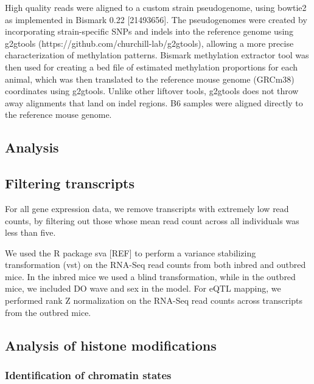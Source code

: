 \documentclass[10pt,letterpaper]{article}
\begin{document}
High quality reads were aligned to a custom strain pseudogenome, using
bowtie2 as implemented in Bismark 0.22 {[}21493656{]}. The pseudogenomes
were created by incorporating strain-specific SNPs and indels into the
reference genome using g2gtools
(https://github.com/churchill-lab/g2gtools), allowing a more precise
characterization of methylation patterns. Bismark methylation extractor
tool was then used for creating a bed file of estimated methylation
proportions for each animal, which was then translated to the reference
mouse genome (GRCm38) coordinates using g2gtools. Unlike other liftover
tools, g2gtools does not throw away alignments that land on indel
regions. B6 samples were aligned directly to the reference mouse genome.

\hypertarget{analysis}{%
\subsection{Analysis}\label{analysis}}

\hypertarget{filtering-transcripts}{%
\subsection{Filtering transcripts}\label{filtering-transcripts}}

For all gene expression data, we remove transcripts with extremely low
read counts, by filtering out those whose mean read count across all
individuals was less than five.

We used the R package sva {[}REF{]} to perform a variance stabilizing
transformation (vst) on the RNA-Seq read counts from both inbred and
outbred mice. In the inbred mice we used a blind transformation, while
in the outbred mice, we included DO wave and sex in the model. For eQTL
mapping, we performed rank Z normalization on the RNA-Seq read counts
across transcripts from the outbred mice.

\hypertarget{analysis-of-histone-modifications}{%
\subsection{Analysis of histone
modifications}\label{analysis-of-histone-modifications}}

\hypertarget{identification-of-chromatin-states}{%
\subsubsection{Identification of chromatin
states}\label{identification-of-chromatin-states}}
\end{document}
